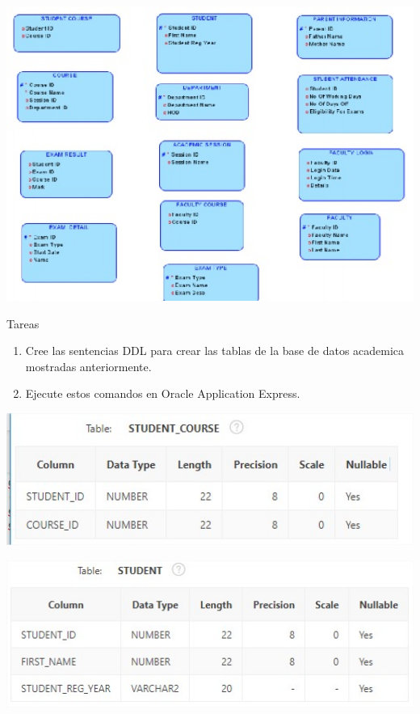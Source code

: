 \documentclass[12pt,letterpaper]{article}
\begin{document}
\begin{center}
\includegraphics[width=15cm]{./llatasiImagen/imagen1}
\end{center}

Tareas\\
\begin{enumerate}[1.]
    \item  Cree las sentencias DDL para crear las tablas de la base de datos academica mostradas anteriormente.  
     
    \item Ejecute estos comandos en Oracle Application Express.
    
		\end{enumerate} 

\begin{center}
\includegraphics[width=15cm]{./llatasiImagen/tabla1}
\end{center}		
		

\begin{center}
\includegraphics[width=15cm]{./llatasiImagen/tabla2}
\end{center}		
		
\end{document}
